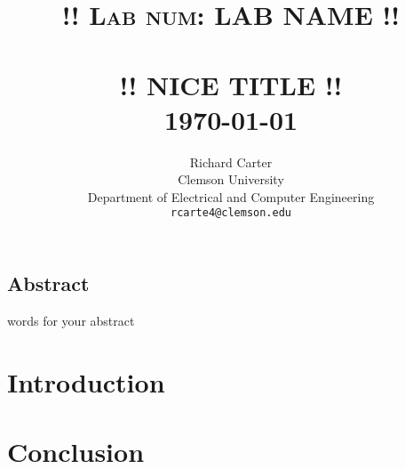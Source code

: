 \documentclass[paper=a4, fontsize=11pt,twoside]{scrartcl}
\title{	\normalsize \textsc{!! Lab num: LAB NAME !!} 	%
	\\[2.0cm]								%
	\HRule{0.5pt} \\						%
	\LARGE \textbf{\uppercase{!! NICE TITLE !!}}	%
	\HRule{2pt} \\ [0.5cm]		%
	\normalsize \today			%
}
\author{
	Richard Carter\\	
	Clemson University\\	
	Department of Electrical and Computer Engineering\\
	\texttt{rcarte4@clemson.edu} \\
}
\makeatletter
\def\printtitle{%
	{\centering \@title\par}}
\def\printauthor{%
	{\centering \large \@author}}
\makeatother
\begin{document}
\thispagestyle{empty}		%

\printtitle					%
\vfill
\printauthor				%
\newpage

\thispagestyle{empty}
\vspace*{\fill}
\begin{center}
\begin{Huge}
\section{Abstract} %
\label{sec:abstract}
\end{Huge}
\end{center}
words for your abstract

\vspace*{\fill}
\newpage


\setcounter{page}{1}		%
\section{Introduction} %
\label{sec:introduction}


\section{Conclusion} %
\label{sec:conclusion}







\end{document}
